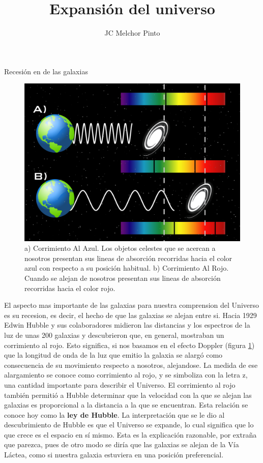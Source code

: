 \documentclass[12pt,addpoints]{guia}
\title{Expansión del universo}
\author{JC Melchor Pinto}
\begin{document}
\INFO%
\begin{sectionbox}{Recesión en de las galaxias}
    \begin{figure}
        \centering
        \includegraphics[width=\linewidth]{../images/tumblr_n7luwbd1pO1tf8xldo1_1280}
        \caption{a) Corrimiento Al Azul. Los objetos celestes que se acercan a nosotros presentan sus lineas de absorción recorridas hacia el color azul con respecto a su posición habitual.
            b) Corrimiento Al Rojo. Cuando se alejan de nosotros presentan sus lineas de absorción recorridas hacia el color rojo.}
        \label{fig:tumblr_n7luwbd1pO1tf8xldo1_1280}
    \end{figure}
    El aspecto mas importante de las galaxias para nuestra comprension del Universo es su recesion\label{086a_a}, es decir, el hecho de que las galaxias se alejan entre si. Hacia 1929 Edwin Hubble y sus colaboradores midieron las distancias y los espectros de la luz de unas 200 galaxias y descubrieron que, en general, mostraban un corrimiento al rojo. Esto significa, si nos basamos en el efecto Doppler (figura \ref{fig:tumblr_n7luwbd1pO1tf8xldo1_1280}) que la longitud de onda de la luz que emitio la galaxia se alargó como consecuencia de su movimiento\label{086b_a} respecto a nosotros, alejandose. La medida de ese alargamiento se conoce como corrimiento al rojo, y se simboliza con la letra z, \label{086a_b}una cantidad importante para describir el Universo.
    El corrimiento al rojo también permitió a
    Hubble determinar que la \label{086b_b}velocidad con la que
    se alejan las galaxias es proporcional a la distancia a la que se encuentran. Esta relación se
    conoce hoy como la \textbf{ley de Hubble}\label{086a_c}.
    La interpretación que se le dio al descubrimiento de Hubble\label{086b_c} es que el Universo se expande, lo
    cual significa que lo que crece es el espacio en
    sí mismo. Esta es la explicación razonable, por
    extraña que parezca, pues de otro modo se diría
    que las galaxias se alejan de la Vía Láctea, como
    si nuestra galaxia estuviera en una posición preferencial.
\end{sectionbox}
\end{document}
